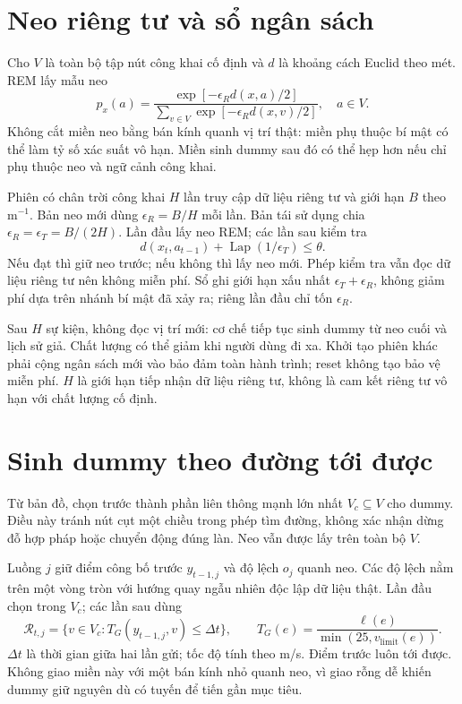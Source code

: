 \section{Neo riêng tư và sổ ngân sách}

Cho $V$ là toàn bộ tập nút công khai cố định và $d$ là khoảng cách Euclid theo mét. REM lấy mẫu neo
\begin{equation}
p_x(a)=\frac{\exp[-\epsilon_R d(x,a)/2]}{\sum_{v\in V}\exp[-\epsilon_R d(x,v)/2]},\quad a\in V.
\label{eq:report-anchor}
\end{equation}
Không cắt miền neo bằng bán kính quanh vị trí thật: miền phụ thuộc bí mật có thể làm tỷ số xác suất vô hạn. Miền sinh dummy sau đó có thể hẹp hơn nếu chỉ phụ thuộc neo và ngữ cảnh công khai.

Phiên có chân trời công khai $H$ lần truy cập dữ liệu riêng tư và giới hạn $B$ theo $\mathrm{m}^{-1}$. Bản neo mới dùng $\epsilon_R=B/H$ mỗi lần. Bản tái sử dụng chia $\epsilon_R=\epsilon_T=B/(2H)$. Lần đầu lấy neo REM; các lần sau kiểm tra
\[
d(x_t,a_{t-1})+\operatorname{Lap}(1/\epsilon_T)\leq\theta.
\]
Nếu đạt thì giữ neo trước; nếu không thì lấy neo mới. Phép kiểm tra vẫn đọc dữ liệu riêng tư nên không miễn phí. Sổ ghi giới hạn xấu nhất $\epsilon_T+\epsilon_R$, không giảm phí dựa trên nhánh bí mật đã xảy ra; riêng lần đầu chỉ tốn $\epsilon_R$.

Sau $H$ sự kiện, không đọc vị trí mới: cơ chế tiếp tục sinh dummy từ neo cuối và lịch sử giả. Chất lượng có thể giảm khi người dùng đi xa. Khởi tạo phiên khác phải cộng ngân sách mới vào bảo đảm toàn hành trình; reset không tạo bảo vệ miễn phí. $H$ là giới hạn tiếp nhận dữ liệu riêng tư, không là cam kết riêng tư vô hạn với chất lượng cố định.

\section{Sinh dummy theo đường tới được}

Từ bản đồ, chọn trước thành phần liên thông mạnh lớn nhất $V_c\subseteq V$ cho dummy. Điều này tránh nút cụt một chiều trong phép tìm đường, không xác nhận dừng đỗ hợp pháp hoặc chuyển động đúng làn. Neo vẫn được lấy trên toàn bộ $V$.

Luồng $j$ giữ điểm công bố trước $y_{t-1,j}$ và độ lệch $o_j$ quanh neo. Các độ lệch nằm trên một vòng tròn với hướng quay ngẫu nhiên độc lập dữ liệu thật. Lần đầu chọn trong $V_c$; các lần sau dùng
\[
\mathcal R_{t,j}=\{v\in V_c:T_G(y_{t-1,j},v)\leq\Delta t\},\qquad
T_G(e)=\frac{\ell(e)}{\min(25,v_{\mathrm{limit}}(e))}.
\]
$\Delta t$ là thời gian giữa hai lần gửi; tốc độ tính theo m/s. Điểm trước luôn tới được. Không giao miền này với một bán kính nhỏ quanh neo, vì giao rỗng dễ khiến dummy giữ nguyên dù có tuyến để tiến gần mục tiêu.

